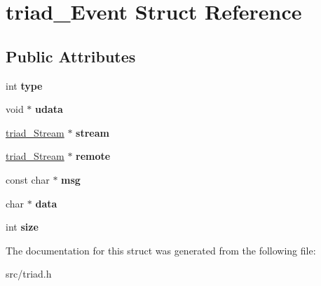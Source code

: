 \hypertarget{structtriad___event}{}\section{triad\+\_\+\+Event Struct Reference}
\label{structtriad___event}
\subsection*{Public Attributes}
\begin{DoxyCompactItemize}
\item 
\mbox{\label{structtriad___event_ae1100c21b90a6cff0b13fa1075f173ba}} 
int {\bfseries type}
\item 
\mbox{\label{structtriad___event_a7d12cda36b419e627a8a2d33c1b47c83}} 
void $\ast$ {\bfseries udata}
\item 
\mbox{\label{structtriad___event_a640ebbeb776f0e23d3f371f9c4eed3ed}} 
\mbox{\hyperlink{structtriad___stream}{triad\+\_\+\+Stream}} $\ast$ {\bfseries stream}
\item 
\mbox{\label{structtriad___event_a172ac786afbdd3258b0e528791aa6de1}} 
\mbox{\hyperlink{structtriad___stream}{triad\+\_\+\+Stream}} $\ast$ {\bfseries remote}
\item 
\mbox{\label{structtriad___event_aa755da8025b2234967f81bd89f39698d}} 
const char $\ast$ {\bfseries msg}
\item 
\mbox{\label{structtriad___event_a239389292dfc6bbe8b7c46f6c5c54909}} 
char $\ast$ {\bfseries data}
\item 
\mbox{\label{structtriad___event_a0b9b15b89abb52981af429e124068e3e}} 
int {\bfseries size}
\end{DoxyCompactItemize}


The documentation for this struct was generated from the following file\+:\begin{DoxyCompactItemize}
\item 
src/triad.\+h\end{DoxyCompactItemize}
